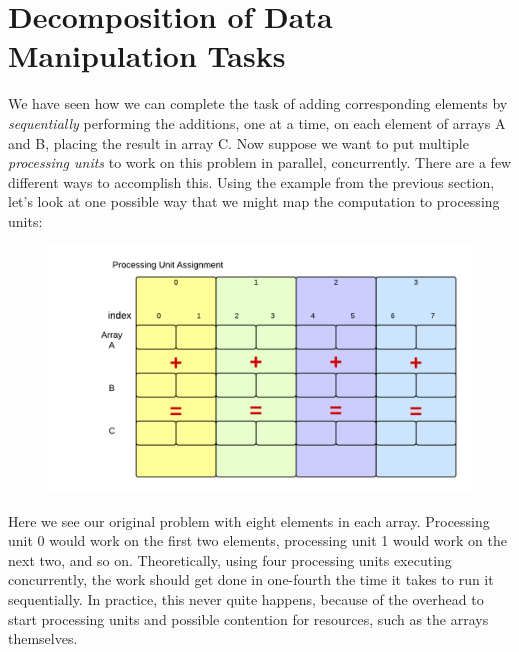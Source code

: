 \documentclass[letterpaper,10pt,openany,oneside]{sphinxmanual}
\begin{document}
\chapter{Decomposition of Data Manipulation Tasks}
\label{Decomposition/VecAddDecomposition:decomposition-of-data-manipulation-tasks}\label{Decomposition/VecAddDecomposition::doc}
We have seen how we can complete the task of adding corresponding elements by \emph{sequentially} performing the additions, one at a time, on each element of arrays A and B, placing the result in array C.  Now suppose we want to put multiple \emph{processing units} to work on this problem in parallel, concurrently.  There are a few different ways to accomplish this.  Using the example from the previous section, let's look at one possible way that we might map the computation to processing units:
\begin{figure}[htbp]
\centering

\includegraphics{Decomposition.png}
\end{figure}

Here we see our original problem with eight elements in each array. Processing unit 0 would work on the first two elements, processing unit 1 would work on the next two, and so on.  Theoretically, using four processing units executing concurrently, the work should get done in one-fourth the time it takes to run it sequentially.  In practice, this never quite happens, because of the overhead to start processing units and possible contention for resources, such as the arrays themselves.
\end{document}
